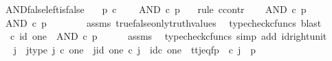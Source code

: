 \begin{isabellebody}
\endisatagproof
{\isafoldproof}%
%
\isadelimproof
\isanewline
%
\endisadelimproof
\isanewline
{}\isamarkupfalse%
\ AND{\isacharunderscore}{\kern0pt}false{\isacharunderscore}{\kern0pt}left{\isacharunderscore}{\kern0pt}is{\isacharunderscore}{\kern0pt}false{\isacharcolon}{\kern0pt}\isanewline
\ \ \ {\isachardoublequoteopen}p\ {\isasymin}\isactrlsub c\ {\isasymOmega}{\isachardoublequoteclose}\isanewline
\ \ \ {\isachardoublequoteopen}AND\ {\isasymcirc}\isactrlsub c\ {\isasymlangle}{\isasymf}{\isacharcomma}{\kern0pt}p{\isasymrangle}\ {\isacharequal}{\kern0pt}\ {\isasymf}{\isachardoublequoteclose}\isanewline
%
\isadelimproof
%
\endisadelimproof
%
\isatagproof
{}\isamarkupfalse%
\ {\isacharparenleft}{\kern0pt}rule\ ccontr{\isacharparenright}{\kern0pt}\isanewline
\ \ \isamarkupfalse%
\ {\isachardoublequoteopen}AND\ {\isasymcirc}\isactrlsub c\ {\isasymlangle}{\isasymf}{\isacharcomma}{\kern0pt}p{\isasymrangle}\ {\isasymnoteq}\ {\isasymf}{\isachardoublequoteclose}\isanewline
\ \ \isamarkupfalse%
\ \isamarkupfalse%
\ {\isachardoublequoteopen}AND\ {\isasymcirc}\isactrlsub c\ {\isasymlangle}{\isasymf}{\isacharcomma}{\kern0pt}p{\isasymrangle}\ {\isacharequal}{\kern0pt}\ {\isasymt}{\isachardoublequoteclose}\isanewline
\ \ \ \ \isamarkupfalse%
\ assms\ true{\isacharunderscore}{\kern0pt}false{\isacharunderscore}{\kern0pt}only{\isacharunderscore}{\kern0pt}truth{\isacharunderscore}{\kern0pt}values\ \isamarkupfalse%
\ {\isacharparenleft}{\kern0pt}typecheck{\isacharunderscore}{\kern0pt}cfuncs{\isacharcomma}{\kern0pt}\ blast{\isacharparenright}{\kern0pt}\isanewline
\ \ \isamarkupfalse%
\ \isamarkupfalse%
\ {\isachardoublequoteopen}{\isasymt}\ {\isasymcirc}\isactrlsub c\ id\ one\ {\isacharequal}{\kern0pt}\ AND\ {\isasymcirc}\isactrlsub c\ {\isasymlangle}{\isasymf}{\isacharcomma}{\kern0pt}p{\isasymrangle}{\isachardoublequoteclose}\isanewline
\ \ \ \ \isamarkupfalse%
\ assms\ \isamarkupfalse%
\ {\isacharparenleft}{\kern0pt}typecheck{\isacharunderscore}{\kern0pt}cfuncs{\isacharcomma}{\kern0pt}\ simp\ add{\isacharcolon}{\kern0pt}\ id{\isacharunderscore}{\kern0pt}right{\isacharunderscore}{\kern0pt}unit{}{\isacharparenright}{\kern0pt}\isanewline
\ \ \isamarkupfalse%
\ \isamarkupfalse%
\ j\ \ j{\isacharunderscore}{\kern0pt}type{\isacharcolon}{\kern0pt}\ {\isachardoublequoteopen}j\ {\isasymin}\isactrlsub c\ one{\isachardoublequoteclose}\ \ j{\isacharunderscore}{\kern0pt}id{\isacharcolon}{\kern0pt}\ {\isachardoublequoteopen}{\isasymbeta}\isactrlbsub one\isactrlesub \ {\isasymcirc}\isactrlsub c\ j\ {\isacharequal}{\kern0pt}\ id\isactrlsub c\ one{\isachardoublequoteclose}\ \ tt{\isacharunderscore}{\kern0pt}j{\isacharunderscore}{\kern0pt}eq{\isacharunderscore}{\kern0pt}fp{\isacharcolon}{\kern0pt}\ {\isachardoublequoteopen}{\isasymlangle}{\isasymt}{\isacharcomma}{\kern0pt}{\isasymt}{\isasymrangle}\ {\isasymcirc}\isactrlsub c\ j\ {\isacharequal}{\kern0pt}\ {\isasymlangle}{\isasymf}{\isacharcomma}{\kern0pt}p{\isasymrangle}{\isachardoublequoteclose}\isanewline

\end{isabellebody}

